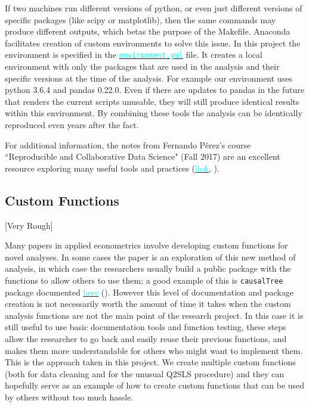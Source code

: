 \documentclass[12pt]{article}
\newcommand{\inlinecode}{\texttt}
\begin{document}
If two machines run different versions of python, or even just different versions of specific packages (like scipy or matplotlib), then the same commands may produce different outputs, which betas the purpose of the Makefile. Anaconda facilitates creation of custom environments to solve this issue. In this project the environment is specified in the \href{https://github.com/nadavtadelis/Reproducible_Metrics/blob/master/environment.yml}{\textcolor{cyan}{\inlinecode{environment.yml}}} file. It creates a local environment with only the packages that are used in the analysis and their specific versions at the time of the analysis. For example our environment uses python 3.6.4 and pandas 0.22.0. Even if there are updates to pandas in the future that renders the current scripts unusable, they will still produce identical results within this environment. By combining these tools the analysis can be identically reproduced even years after the fact.

For additional information, the notes from Fernando P\'erez's course ``Reproducible and Collaborative Data Science" (Fall 2017) are an excellent resource exploring many useful tools and practices (\href{https://berkeley-stat159-f17.github.io/stat159-f17/}{\textcolor{cyan}{link}}, \cite{stat159}).

\subsection{Custom Functions}
\textcolor{BrickRed}{[Very Rough]}

Many papers in applied econometrics involve developing custom functions for novel analyses. In some cases the paper is an exploration of this new method of analysis, in which case the researchers usually build a public package with the functions to allow others to use them; a good example of this is \inlinecode{causalTree} package documented \href{https://github.com/susanathey/causalTree}{\textcolor{cyan}{here}} (\cite{causalTree}). However this level of documentation and package creation is not necessarily worth the amount of time it takes when the custom analysis functions are not the main point of the research project. In this case it is still useful to use basic documentation tools and function testing, these steps allow the researcher to go back and easily reuse their previous functions, and makes them more understandable for others who might want to implement them. This is the approach taken in this project. We create multiple custom functions (both for data cleaning and for the unusual Q2SLS procedure) and they can hopefully serve as an example of how to create custom functions that can be used by others without too much hassle. 
\end{document}
